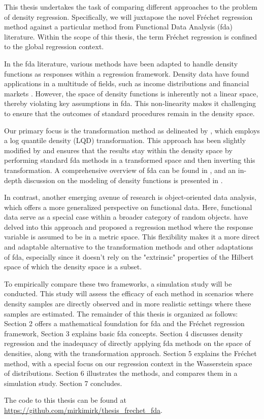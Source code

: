 This thesis undertakes the task of comparing different approaches to 
the problem of density regression. Specifically, we will juxtapose the 
novel Fréchet regression method against a particular method from Functional Data 
Analysis (fda) literature. Within the scope of this thesis, the term Fréchet 
regression is confined to the global regression context.

In the fda literature, various methods have been adapted to handle density 
functions as responses within a regression framework. Density data have found 
applications in a multitude of fields, such as income distributions 
\parencite{HildenbrandKneipUtikal1999,KneipUtikal2001} and financial markets \parencite{KokoszkaEtAl2019}. 
However, the space of density functions is inherently not a linear space, thereby 
violating key assumptions in fda. This non-linearity makes it challenging to 
ensure that the outcomes of standard procedures remain in the density space.

Our primary focus is the transformation method as delineated by 
\textcite{PetersenMüller2016}, which employs a log quantile density (LQD) 
transformation. This approach has been slightly modified by \textcite{KokoszkaEtAl2019}
and ensures that the results stay within the density space by performing standard 
fda methods in a transformed space and then inverting this transformation. A 
comprehensive overview of fda can be found in \textcite{WangChiouMüller2016}, 
and an in-depth discussion on the modeling of density functions is presented in 
\textcite{PetersenZhangKokoszka2022}.

In contrast, another emerging avenue of research is object-oriented data analysis, 
which offers a more generalized perspective on functional data. Here, functional 
data serve as a special case within a broader category of random objects. 
\textcite{PetersenMüller2019} have delved into this approach and proposed a 
regression method where the response variable is assumed to be in a metric space. 
This flexibility makes it a more direct and adaptable alternative to the 
transformation methods and other adaptations of fda, especially since it doesn't 
rely on the "extrinsic" properties of the Hilbert space of which the density space 
is a subset.

To empirically compare these two frameworks, a simulation study will be conducted. 
This study will assess the efficacy of each method in scenarios where density samples 
are directly observed and in more realistic settings where these samples are estimated. 
The remainder of this thesis is organized as follows: Section 2 offers a mathematical 
foundation for fda and the Fréchet regression framework, Section 3 explains basic fda
concepts. Section 4 discusses density regression and the inadequacy of directly applying
fda methods on the space of densities, along with the transformation approach. Section 5
explains the Fréchet method, with a special focus on our regression context in the Wasserstein
space of distributions. Section 6 illustrates the methods, and compares them in a simulation study.
Section 7 concludes.

The code to this thesis can be found at \url{https://github.com/mirkimirk/thesis_frechet_fda}.
